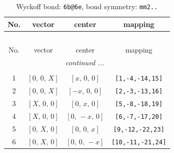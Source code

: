 \documentclass[fleqn,8pt]{jsarticle}
\begin{document}
\begin{longtable}{cccc}
\caption{Wyckoff bond: {\tt 6b@6e}, bond symmetry: {\tt mm2..}}
 \\
 \hline \hline
No. & vector & center & mapping \\ \hline \endfirsthead

\multicolumn{3}{l}{\tablename\ \thetable{}} \\
 \hline \hline
No. & vector & center & mapping \\ \hline \endhead

 \hline \hline
\multicolumn{3}{r}{\footnotesize\it continued ...} \\ \endfoot

 \hline \hline
\multicolumn{3}{r}{} \\ \endlastfoot

1 & $\left[ 0,\, 0,\, X \right]$ & $\left[ x,\, 0,\, 0 \right]$ & {\tt [1,-4,-14,15]} \\ \hline
2 & $\left[ 0,\, 0,\, X \right]$ & $\left[ - x,\, 0,\, 0 \right]$ & {\tt [2,-3,-13,16]} \\ \hline
3 & $\left[ X,\, 0,\, 0 \right]$ & $\left[ 0,\, x,\, 0 \right]$ & {\tt [5,-8,-18,19]} \\ \hline
4 & $\left[ X,\, 0,\, 0 \right]$ & $\left[ 0,\, - x,\, 0 \right]$ & {\tt [6,-7,-17,20]} \\ \hline
5 & $\left[ 0,\, X,\, 0 \right]$ & $\left[ 0,\, 0,\, x \right]$ & {\tt [9,-12,-22,23]} \\ \hline
6 & $\left[ 0,\, X,\, 0 \right]$ & $\left[ 0,\, 0,\, - x \right]$ & {\tt [10,-11,-21,24]} \\
\end{longtable}
\renewcommand{\arraystretch}{1.2}
\end{document}
